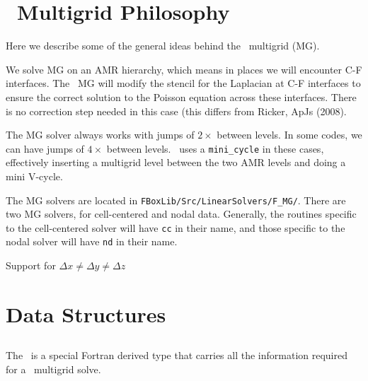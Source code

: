 \section{\FBoxLib\ Multigrid Philosophy}

Here we describe some of the general ideas behind the \FBoxLib\
multigrid (MG).

We solve MG on an AMR hierarchy, which means in places we will encounter
C-F interfaces.  The \FBoxLib\ MG will modify the stencil for the Laplacian
at C-F interfaces to ensure the correct solution to the Poisson equation
across these interfaces.  There is no correction step needed in this
case (this differs from Ricker, ApJs (2008).

The MG solver always works with jumps of $2\times$ between levels.  In 
some codes, we can have jumps of $4\times$ between
levels.  \FBoxLib\ uses a {\tt mini\_cycle} in these cases, effectively
inserting a multigrid level between the two AMR levels and doing a mini
V-cycle.

The MG solvers are located in {\tt FBoxLib/Src/LinearSolvers/F\_MG/}.
There are two MG solvers, for cell-centered and nodal data.
Generally, the routines specific to the cell-centered solver will have
{\tt cc} in their name, and those specific to the nodal solver will have
{\tt nd} in their name.

Support for $\Delta x \ne \Delta y \ne \Delta z$




\section{Data Structures}

\subsection{\mgtower}

The \mgtower\ is a special Fortran derived type that carries all the
information required for a \FBoxLib\ multigrid solve.

